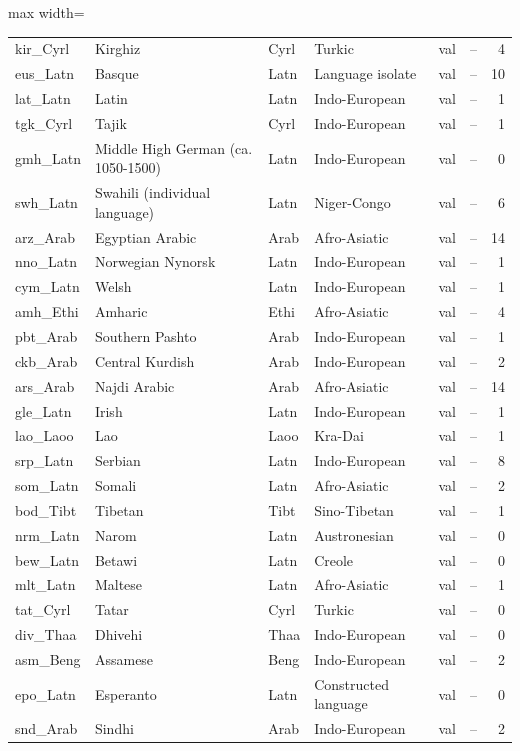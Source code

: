 \begin{table}[p]
\begin{minipage}[t]{0.49\textwidth}
\begin{adjustbox}{max width=\linewidth}
\begin{tabular}[t]{llllrrr}
kir\_Cyrl & Kirghiz & Cyrl & Turkic & val & -- & 4 \\
eus\_Latn & Basque & Latn & Language isolate & val & -- & 10 \\
lat\_Latn & Latin & Latn & Indo-European & val & -- & 1 \\
tgk\_Cyrl & Tajik & Cyrl & Indo-European & val & -- & 1 \\
gmh\_Latn & Middle High German (ca. 1050-1500) & Latn & Indo-European & val & -- & 0 \\
swh\_Latn & Swahili (individual language) & Latn & Niger-Congo & val & -- & 6 \\
arz\_Arab & Egyptian Arabic & Arab & Afro-Asiatic & val & -- & 14 \\
nno\_Latn & Norwegian Nynorsk & Latn & Indo-European & val & -- & 1 \\
cym\_Latn & Welsh & Latn & Indo-European & val & -- & 1 \\
amh\_Ethi & Amharic & Ethi & Afro-Asiatic & val & -- & 4 \\
pbt\_Arab & Southern Pashto & Arab & Indo-European & val & -- & 1 \\
ckb\_Arab & Central Kurdish & Arab & Indo-European & val & -- & 2 \\
ars\_Arab & Najdi Arabic & Arab & Afro-Asiatic & val & -- & 14 \\
gle\_Latn & Irish & Latn & Indo-European & val & -- & 1 \\
lao\_Laoo & Lao & Laoo & Kra-Dai & val & -- & 1 \\
srp\_Latn & Serbian & Latn & Indo-European & val & -- & 8 \\
som\_Latn & Somali & Latn & Afro-Asiatic & val & -- & 2 \\
bod\_Tibt & Tibetan & Tibt & Sino-Tibetan & val & -- & 1 \\
nrm\_Latn & Narom & Latn & Austronesian & val & -- & 0 \\
bew\_Latn & Betawi & Latn & Creole & val & -- & 0 \\
mlt\_Latn & Maltese & Latn & Afro-Asiatic & val & -- & 1 \\
tat\_Cyrl & Tatar & Cyrl & Turkic & val & -- & 0 \\
div\_Thaa & Dhivehi & Thaa & Indo-European & val & -- & 0 \\
asm\_Beng & Assamese & Beng & Indo-European & val & -- & 2 \\
epo\_Latn & Esperanto & Latn & Constructed language & val & -- & 0 \\
snd\_Arab & Sindhi & Arab & Indo-European & val & -- & 2 \\

\end{tabular}
\end{adjustbox}
\end{minipage}
\end{table}
